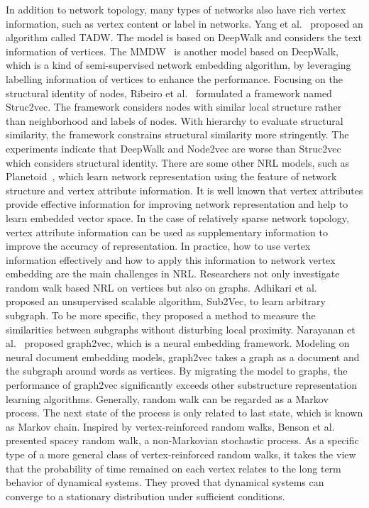 In addition to network topology, many types of networks also have rich vertex information, such as vertex content or label in networks. Yang et al.~ proposed an algorithm called TADW. The model is based on DeepWalk and considers the text information of vertices. The MMDW~ is another model based on DeepWalk, which is a kind of semi-supervised network embedding algorithm, by leveraging labelling
information of vertices to enhance the performance.
Focusing on the structural identity of nodes, Ribeiro et al.~ formulated a framework named Struc2vec. The framework considers nodes with similar local structure rather than neighborhood and labels of nodes. With hierarchy to evaluate structural similarity, the framework constrains structural similarity more stringently. The experiments indicate that DeepWalk and Node2vec are worse than Struc2vec which considers structural identity. There are some other NRL models, such as Planetoid~, which learn network representation using the feature of network structure and vertex attribute information. It is well known that vertex attributes provide effective information for improving network representation and help to learn embedded vector space. In the case of relatively sparse network topology, vertex attribute information can be used as supplementary information to improve the accuracy of representation. In practice, how to use vertex information effectively and how to apply this information to network vertex embedding are the main challenges in NRL.
Researchers not only investigate random walk based NRL on vertices but also on graphs. Adhikari et al.~ proposed an unsupervised scalable algorithm, Sub2Vec, to learn arbitrary subgraph. To be more specific, they proposed a method to measure the similarities between subgraphs without disturbing local proximity. Narayanan et al.~ proposed graph2vec, which is a neural embedding framework. Modeling on neural document embedding models, graph2vec takes a graph as a document and the subgraph around words as vertices. By migrating the model to graphs, the performance of graph2vec significantly exceeds other substructure representation learning algorithms.
Generally, random walk can be regarded as a Markov process. The next state of the process is only related to last state, which is known as Markov chain. Inspired by vertex-reinforced random walks, Benson et al.~ presented spacey random walk, a non-Markovian stochastic process. As a specific type of a more general class of vertex-reinforced random walks, it takes the view that the probability of time remained on each vertex relates to the long term behavior of dynamical systems. They proved that dynamical systems can converge to a stationary distribution under sufficient conditions.
